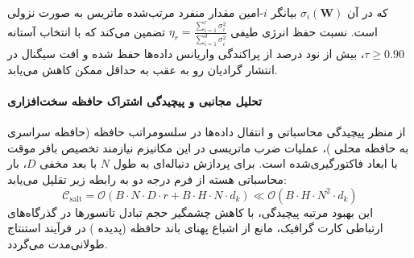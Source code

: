 که در آن $\sigma_i(\mathbf{W})$ بیانگر $i$-امین مقدار منفرد مرتب‌شده ماتریس به صورت نزولی است. نسبت حفظ انرژی طیفی $\eta_r = \frac{\sum_{i=1}^r \sigma_i^2}{\sum_{i=1}^{d} \sigma_i^2}$ تضمین می‌کند که با انتخاب آستانه $\tau \ge 0.90$، بیش از نود درصد از پراکندگی واریانس داده‌ها حفظ شده و افت سیگنال در انتشار گرادیان رو به عقب به حداقل ممکن کاهش می‌یابد.

\paragraph{تحلیل مجانبی و پیچیدگی اشتراک حافظه سخت‌افزاری}
از منظر پیچیدگی محاسباتی و انتقال داده‌ها در سلسومراتب حافظه (حافظه سراسری  به حافظه محلی )، عملیات ضرب ماتریسی در این مکانیزم نیازمند تخصیص بافر موقت با ابعاد فاکتورگیری‌شده است. برای پردازش دنباله‌ای به طول $N$ با بعد مخفی $D$، بار محاسباتی هسته از فرم درجه دو به رابطه زیر تقلیل می‌یابد:
\begin{equation}
\label{eq:complexity_salt}
\mathcal{C}_{\text{salt}} = \mathcal{O}\left( B \cdot N \cdot D \cdot r + B \cdot H \cdot N \cdot d_k \right) \ll \mathcal{O}\left( B \cdot H \cdot N^2 \cdot d_k \right)
\end{equation}
این بهبود مرتبه پیچیدگی، با کاهش چشمگیر حجم تبادل تانسورها در گذرگاه‌های ارتباطی کارت گرافیک، مانع از اشباع پهنای باند حافظه (پدیده ) در فرآیند استنتاج طولانی‌مدت می‌گردد.